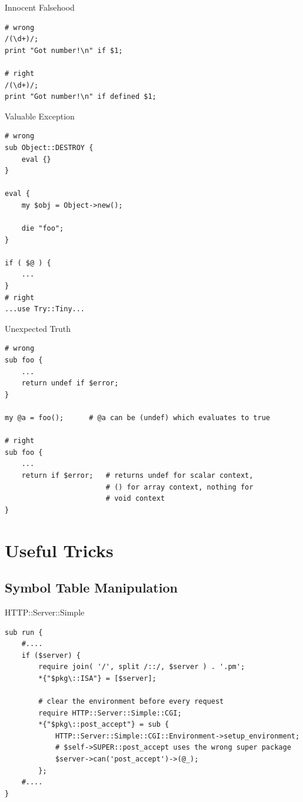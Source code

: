 \documentclass{beamer}
\begin{document}
\begin{frame}[containsverbatim]{Innocent Falsehood}
\begin{lstlisting}[caption=Innocent Falsehood]
# wrong
/(\d+)/;
print "Got number!\n" if $1;

# right
/(\d+)/;
print "Got number!\n" if defined $1;
\end{lstlisting}
\end{frame}


\begin{frame}[containsverbatim]{Valuable Exception}
\begin{lstlisting}[caption=Valuable Exception]
# wrong
sub Object::DESTROY {
    eval {}
}

eval {
    my $obj = Object->new();

    die "foo";
}

if ( $@ ) {
    ...
}
# right
...use Try::Tiny...
\end{lstlisting}
\end{frame}

\begin{frame}[containsverbatim]{Unexpected Truth}
\begin{lstlisting}[caption=Unexpected Truth]
# wrong
sub foo {
    ...
    return undef if $error;
}

my @a = foo();      # @a can be (undef) which evaluates to true

# right
sub foo {
    ...
    return if $error;   # returns undef for scalar context,
                        # () for array context, nothing for
                        # void context
}
\end{lstlisting}
\end{frame}


\section{Useful Tricks}
  \subsection{Symbol Table Manipulation}

\begin{frame}[containsverbatim]{HTTP::Server::Simple}
\begin{lstlisting}[caption=HTTP::Server::Simple]
sub run {
    #....
    if ($server) {
        require join( '/', split /::/, $server ) . '.pm';
        *{"$pkg\::ISA"} = [$server];

        # clear the environment before every request
        require HTTP::Server::Simple::CGI;
        *{"$pkg\::post_accept"} = sub {
            HTTP::Server::Simple::CGI::Environment->setup_environment;
            # $self->SUPER::post_accept uses the wrong super package
            $server->can('post_accept')->(@_);
        };
    #....
}
\end{lstlisting}
\end{frame}
\end{document}
